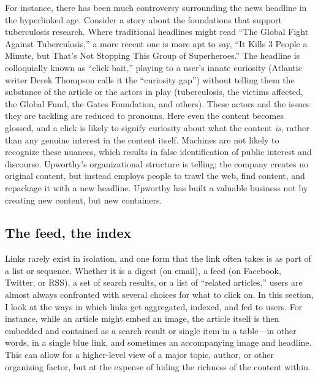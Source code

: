 For instance, there has been much controversy surrounding the news headline in the hyperlinked age. Consider a story about the foundations that support tuberculosis research. Where traditional headlines might read ``The Global Fight Against Tuberculosis,'' a more recent one is more apt to say, ``It Kills 3 People a Minute, but That's Not Stopping This Group of Superheroes.''\autocite{find upworthy ref} The headline is colloquially known as ``click bait,'' playing to a user's innate curiosity (Atlantic writer Derek Thompson calls it the ``curiosity gap'')\autocite{thompson_upworthy:_2013} without telling them the substance of the article or the actors in play (tuberculosis, the victims affected, the Global Fund, the Gates Foundation, and others). These actors and the issues they are tackling are reduced to pronouns. Here even the content becomes glossed, and a click is likely to signify curiosity about what the content \emph{is}, rather than any genuine interest in the content itself. Machines are not likely to recognize these nuances, which results in false identification of public interest and discourse. Upworthy's organizational structure is telling; the company creates no original content, but instead employs people to trawl the web, find content, and repackage it with a new headline. Upworthy has built a valuable business not by creating new content, but new containers.

\subsection{The feed, the index}

Links rarely exist in isolation, and one form that the link often takes is as part of a list or sequence. Whether it is a digest (on email), a feed (on Facebook, Twitter, or RSS), a set of search results, or a list of ``related articles,'' users are almost always confronted with several choices for what to click on. In this section, I look at the ways in which links get aggregated, indexed, and fed to users. For instance, while an article might embed an image, the article itself is then embedded and contained as a search result or single item in a table---in other words, in a single blue link, and sometimes an accompanying image and headline. This can allow for a higher-level view of a major topic, author, or other organizing factor, but at the expense of hiding the richness of the content within.

